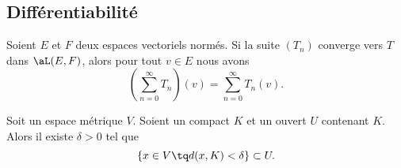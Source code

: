 \subsection{Différentiabilité}

\begin{lemma}       \label{LEMooPIWYooZEofkW}
	Soient \( E\) et \( F\) deux espaces vectoriels normés. Si la suite \( (T_n)\) converge vers \( T\) dans \( \aL(E,F)\), alors pour tout \( v\in E\) nous avons
	\begin{equation}
		\left( \sum_{n=0}^{\infty}T_n \right)(v)=\sum_{n=0}^{\infty}T_n(v).
	\end{equation}
\end{lemma}


\begin{lemma}       \label{LEMooEYARooNExmiw}
	Soit un espace métrique \( V\). Soient un compact \( K\) et un ouvert \( U\) contenant \( K\). Alors il existe \( \delta>0\) tel que
	\begin{equation}
		\{ x\in V\tq d(x,K)<\delta \}\subset U.
	\end{equation}
\end{lemma}

